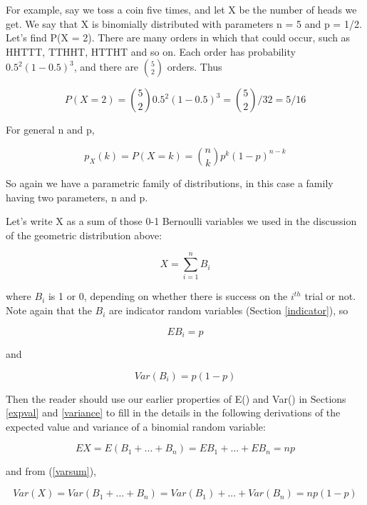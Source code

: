 For example, say we toss a coin five times, and let X be the number of
heads we get.  We say that X is binomially distributed with parameters n
= 5 and p = 1/2.  Let's find P(X = 2).  There are many orders in which
that could occur, such as HHTTT, TTHHT, HTTHT and so on.  Each order has
probability $0.5^2(1-0.5)^3$, and there are $\binom{5}{2}$ orders.  Thus

\begin{equation}
P(X = 2) = \binom{5}{2} 0.5^2(1-0.5)^3 = \binom{5}{2} / 32 = 5/16 
\end{equation}

For general n and p,

\begin{equation}
p_X(k) = P(X = k) = \binom{n}{k} p^k (1-p)^{n-k}  
\end{equation}

So again we have a parametric family of distributions, in this case a
family having two parameters, n and p.

Let's write X as a sum of those 0-1 Bernoulli variables we used in the
discussion of the geometric distribution above:

\begin{equation}
X = \sum_{i=1}^{n} B_i
\end{equation}

where $B_i$ is 1 or 0, depending on whether there is success on the
$i^{th}$ trial or not.  Note again that the $B_i$ are indicator random
variables (Section \ref{indicator}),  so 

\begin{equation}
EB_i = p
\end{equation}

and 

\begin{equation}
Var(B_i) = p(1-p)
\end{equation}

Then the reader should use our earlier properties of E() and Var() in
Sections \ref{expval} and \ref{variance} to fill in the details in the
following derivations of the expected value and variance of a binomial
random variable:

\begin{equation}
\label{binmean}
EX = E(B_1+...+B_n) = EB_1 + ... + EB_n = np
\end{equation}

and from (\ref{varsum}),

\begin{equation}
\label{binvar}
Var(X) = Var(B_1+...+B_n) = Var(B_1) + ... + Var(B_n) = np(1-p)
\end{equation}

